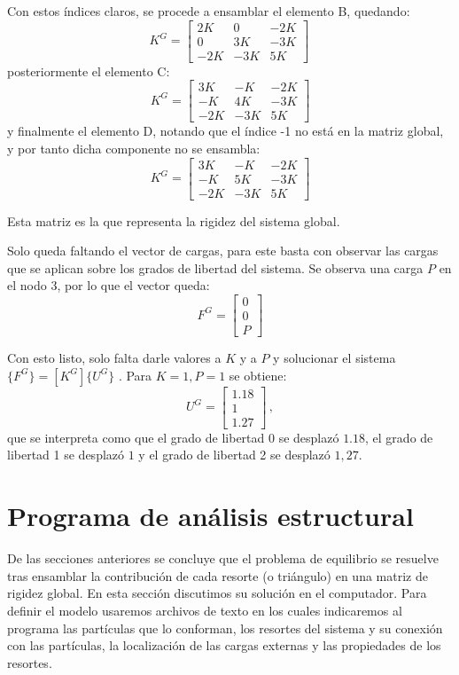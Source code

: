 Con estos índices claros, se procede a ensamblar el elemento B, quedando:
$$K^G = 
\begin{bmatrix}
2K & 0 & -2K \\
0 & 3K & -3K \\
-2K & -3K & 5K 
\end{bmatrix}\, 
$$
posteriormente el elemento C:
$$K^G = 
\begin{bmatrix}
3K & -K & -2K \\
-K & 4K & -3K \\
-2K & -3K & 5K 
\end{bmatrix}
$$
y finalmente el elemento D, notando que el índice -1 no está en la matriz 
global, y por tanto dicha componente no se ensambla:
$$K^G = 
\begin{bmatrix}
3K & -K & -2K \\
-K & 5K & -3K \\
-2K & -3K & 5K 
\end{bmatrix}
$$

Esta matriz es la que representa la rigidez del sistema global.

Solo queda faltando el vector de cargas, para este basta con observar las 
cargas que se aplican sobre los grados de libertad del sistema. Se observa una 
carga $P$ en el nodo 3, por lo que el vector queda: 
$$F^G = 
\begin{bmatrix}
0 \\
0 \\
P
\end{bmatrix}
$$

Con esto listo, solo falta darle valores a $K$ y a $P$ y solucionar el sistema  
$ \{ F^G \} = [ K^G ] \{ U^G \}$ . Para $K = 1, P = 1$ se obtiene:
$$U^G = 
\begin{bmatrix}
1.18 \\
1 \\
1.27
\end{bmatrix}\, ,
$$
que se interpreta como que el grado de libertad 0 se desplazó $1.18$, el 
grado de libertad 1 se desplazó $1$ y el grado de libertad 2 se desplazó 
$1,27$.

\section{Programa de análisis estructural}

De las secciones anteriores se concluye que el problema de equilibrio se 
resuelve tras ensamblar la contribución de cada resorte (o triángulo) en una 
matriz de rigidez global. En esta sección discutimos su solución en el 
computador. Para definir el modelo usaremos archivos de texto en los cuales 
indicaremos al programa las partículas que lo conforman, los resortes del 
sistema y su conexión con las partículas, la localización de las cargas 
externas y las propiedades de los resortes.

